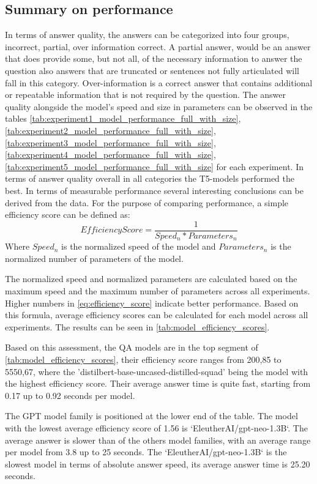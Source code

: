 \documentclass{wseas}
\begin{document}
\subsection{Summary on performance}
In terms of answer quality, the answers can be categorized into four groups, incorrect, partial, 
over information correct. A partial answer, would be an answer that does provide some, but not
all, of the necessary information to answer the question also answers that are truncated or sentences
not fully articulated will fall in this category. Over-information is a correct answer that
contains additional or repeatable information that is not required by the question. The answer
quality alongside the model's speed and size in parameters can be observed in the tables 
\autoref{tab:experiment1_model_performance_full_with_size}, \autoref{tab:experiment2_model_performance_full_with_size}, 
\autoref{tab:experiment3_model_performance_full_with_size}, \autoref{tab:experiment4_model_performance_full_with_size},
\autoref{tab:experiment5_model_performance_full_with_size} for each experiment.
In terms of answer quality overall in all categories the T5-models performed the best. 
In terms of measurable performance several interesting conclusions can be derived from the data.
For the purpose of comparing performance, a simple efficiency score can be defined as:
\begin{equation}
  \textstyle  
EfficiencyScore = \frac{1}{Speed_n * Parameters_n}
  \label{eq:efficiency_score}
\end{equation}
Where $Speed_n$ is the normalized speed of the model and $Parameters_n$ is the normalized number of parameters
of the model.

The normalized speed and normalized parameters are calculated based on the maximum speed and the
maximum number of parameters across all experiments. Higher numbers in \autoref{eq:efficiency_score}
indicate better performance. Based on this formula, average efficiency scores can be calculated 
for each model across all experiments. The results can be seen in \autoref{tab:model_efficiency_scores}.

Based on this assessment, the QA models are in the top segment of  \autoref{tab:model_efficiency_scores},
their efficiency score ranges from 200,85 to 5550,67, where the 'distilbert-base-uncased-distilled-squad'
being the model with the highest efficiency score. Their average answer time is quite fast, starting from 0.17 up
to 0.92 seconds per model.

The GPT model family is positioned at the lower end of the table. The model with the lowest average efficiency score
of 1.56 is `EleutherAI/gpt-neo-1.3B`. The average answer is slower than of the others model families, with an average range per model
from 3.8 up to 25 seconds. The `EleutherAI/gpt-neo-1.3B` is the slowest model in terms of absolute answer speed,
its average answer time is 25.20 seconds.
\end{document}
